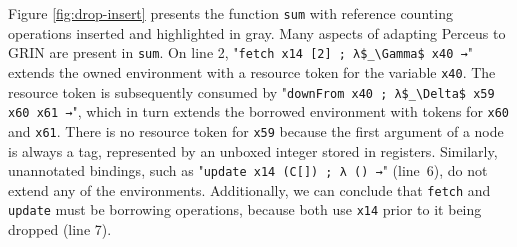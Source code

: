 \documentclass[9pt, twocolumn]{article}
\begin{document}
Figure \ref{fig:drop-insert} presents the function \lstinline{sum} with reference counting operations inserted and highlighted in gray.
Many aspects of adapting Perceus to GRIN are present in \lstinline{sum}. 
On line 2, "\lstinline{fetch x14 [2] ; λ$_\Gamma$ x40 →}" extends the owned environment with a resource token for the variable \lstinline{x40}. 
The resource token is subsequently consumed by "\lstinline{downFrom x40 ; λ$_\Delta$ x59 x60 x61 →}", which in turn extends the borrowed environment with tokens for \lstinline{x60}  and \lstinline{x61}.
There is no resource token for \lstinline{x59} because the first argument of a node is always a tag, represented by an unboxed integer stored in registers. 
Similarly, unannotated bindings, such as "\lstinline{update x14 (C[]) ; λ () →}" \mbox{(line 6)}, do not extend any of the environments.
Additionally, we can conclude that \lstinline{fetch} and \lstinline{update} must be borrowing operations, because both use \lstinline{x14} prior to it being dropped (line 7).

%
\end{document}
